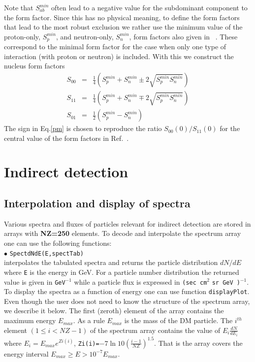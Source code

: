 \documentclass[12pt,a4paper]{article}
\begin{document}
Note that $S_{ab}^{min}$ often lead to a negative value for the subdominant component to the form factor. Since this has no physical meaning, to define the form factors that lead to the most robust exclusion we rather use the minimum value of  the proton-only, $S_p^{min}$,   and neutron-only, $S_n^{min}$,  form factors also given in ~\cite{Klos:2013rwa}. These  correspond to the minimal form factor for the case when only one type of interaction (with proton or neutron) is included. With this we construct  the nucleus form factors 
\begin{eqnarray}
\label{pm}
  S_{00}&=& \frac{1}{4} \left(S_p^{min} +S_n^{min} \pm 2 \sqrt{S_p^{min} S_n^{min}}\right)\\
\nonumber
  S_{11}&=& \frac{1}{4}  \left(S_p^{min} +S_n^{min} \mp 2 \sqrt{S_p^{min} S_n^{min}}\right)\\
\nonumber
  S_{01}&=& \frac{1}{2}  (S_p^{min}-S_n^{min}) 
\end{eqnarray} 
The sign in Eq.\ref{pm} is chosen  to reproduce the  ratio $S_{00}(0)/{S}_{11}(0)$ for the central value of the form factors in Ref.~\cite{Klos:2013rwa}.

\section{Indirect detection}

\subsection{Interpolation and display of spectra}
Various spectra and fluxes  of particles  relevant for indirect detection are stored in
arrays with {\bf NZ=250} elements. To decode and interpolate the spectrum array
one can use the following functions:\\

\noindent
$\bullet$  \verb|SpectdNdE(E,spectTab)|\\
interpolates the tabulated spectra  and returns the 
particle distribution $dN/dE$  where \verb|E| is the energy  in GeV. 
For a particle number  distribution the returned value is given in \verb|GeV|$^{-1}$
while  a particle flux is expressed in \verb|(sec cm|$^2$ \verb|sr GeV )|$^{-1}$.\\
To display the  spectra  as a function of energy one can use function {\tt displayPlot}.\\


Even though the user does not need to know the structure of the  spectrum array, we describe it below.
The first (zeroth) element of the array contains the maximum energy $E_{max}$. As a rule   $E_{max}$ is the mass of the DM particle.    
The $i^{th}$ element $(1\le i < NZ-1)$ of the spectrum array contains
the value of $E_i \frac{ dN}{dE_i} $ where  $E_i=E_{max} e^{Zi(i)}$,   
\verb|Zi(i)=|$ -7 \ln 10 \left(\frac{i-1}{NZ}\right)^{1.5}$.
 That is the array  covers the  energy interval  $E_{max} \ge E > 10^{-7}E_{max}$. \\
\end{document}
